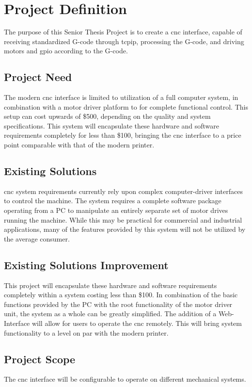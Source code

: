 \chapter{Project Definition}
The purpose of this Senior Thesis Project is to create a \gls{cnc} interface, capable of receiving standardized G-code through \gls{tcpip}, processing the G-code, and driving motors and \gls{gpio} according to the G-code. 

\section{Project Need}
The modern \gls{cnc} interface is limited to utilization of a full computer system, in combination with a motor driver platform to for complete functional control.
This setup can cost upwards of \$500, depending on the quality and system specifications.
This system will encapsulate these hardware and software requirements completely for less than \$100, bringing the \gls{cnc} interface to a price point comparable with that of the modern printer. 

\section{Existing Solutions}
\gls{cnc} system requirements currently rely upon complex computer-driver interfaces to control the machine.
The system requires a complete software package operating from a PC to manipulate an entirely separate set of motor drives running the machine.
While this may be practical for commercial and industrial applications, many of the features provided by this system will not be utilized by the average consumer.

\section{Existing Solutions Improvement}
This project will encapsulate these hardware and software requirements completely within a system costing less than \$100.
In combination of the basic functions provided by the PC with the root functionality of the motor driver unit, the system as a whole can be greatly simplified.
The addition of a Web-Interface will allow for users to operate the \gls{cnc} remotely.
This will bring system functionality to a level on par with the modern printer.

\section{Project Scope}
The \gls{cnc} interface will be configurable to operate on different mechanical systems. 

